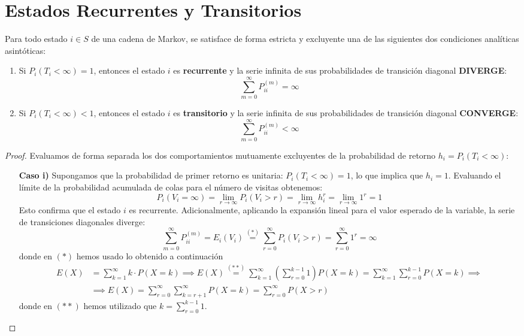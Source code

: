 \section{Estados Recurrentes y Transitorios}

\begin{teo}
    Para todo estado $i \in S$ de una cadena de Markov, se satisface de forma estricta y excluyente una de las siguientes dos condiciones analíticas asintóticas:
    \begin{enumerate}
        \item Si $P_i(T_i < \infty) = 1$, entonces el estado $i$ es \textbf{recurrente} y la serie infinita de sus probabilidades de transición diagonal \textbf{DIVERGE}:
        \[
        \sum_{m=0}^{\infty} P_{ii}^{(m)} = \infty
        \]
        \item Si $P_i(T_i < \infty) < 1$, entonces el estado $i$ es \textbf{transitorio} y la serie infinita de sus probabilidades de transición diagonal \textbf{CONVERGE}:
        \[
        \sum_{m=0}^{\infty} P_{ii}^{(m)} < \infty
        \]
    \end{enumerate}
\begin{proof}
    Evaluamos de forma separada los dos comportamientos mutuamente excluyentes de la probabilidad de retorno $h_i = P_i(T_i < \infty)$:
    \begin{itemize}
        \item[\textbf{Caso i)}] Supongamos que la probabilidad de primer retorno es unitaria: $P_i(T_i < \infty) = 1$, lo que implica que $h_i = 1$. Evaluando el límite de la probabilidad acumulada de colas para el número de visitas obtenemos:
        \[ 
        P_i(V_i = \infty) = \lim_{r \to \infty} P_i(V_i > r) = \lim_{r \to \infty} h_i^r = \lim_{r \to \infty} 1^r = 1 
        \]
        Esto confirma que el estado $i$ es recurrente. Adicionalmente, aplicando la expansión lineal para el valor esperado de la variable, la serie de transiciones diagonales diverge:
        \[
        \sum_{m=0}^{\infty} P_{ii}^{(m)} = E_i(V_i) \overset{(*)}{=} \sum_{r=0}^{\infty} P_i(V_i > r) = \sum_{r=0}^{\infty} 1^r = \infty
        \]
        donde en $(*)$ hemos usado lo obtenido a continuación
        \begin{align*}
            E(X)& = \sum_{k=1}^{\infty} k \cdot P(X = k) \implies E(X) \overset{(**)}{=} \sum_{k=1}^{\infty} \left( \sum_{r=0}^{k-1} 1 \right) P(X = k) = \sum_{k=1}^{\infty} \sum_{r=0}^{k-1} P(X = k) \implies \\
            & \implies E(X) = \sum_{r=0}^{\infty} \sum_{k=r+1}^{\infty} P(X = k)= \sum_{r=0}^{\infty} P(X > r)
        \end{align*}
        donde en $(**)$ hemos utilizado que $k=\sum\limits_{r=0}^{k-1} 1$.
        

\end{itemize}
\end{proof}
\end{teo}
